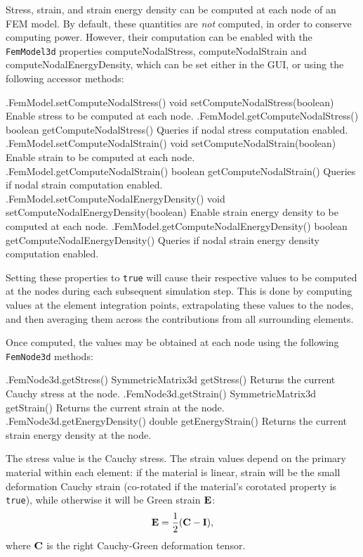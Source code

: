 Stress, strain, and strain energy density can be computed at each node
of an FEM model. By default, these quantities are {\it not} computed,
in order to conserve computing power. However, their computation can
be enabled with the {\tt FemModel3d} properties {\sf
computeNodalStress}, {\sf computeNodalStrain} and {\sf
computeNodalEnergyDensity}, which can be set either in the GUI, or
using the following accessor methods:
%
\begin{methodtable}{0.45}{0.55}
\midline
%
\methodentry
{\fem.FemModel.setComputeNodalStress()}%
{void setComputeNodalStress(boolean)}%
{Enable stress to be computed at each node.}%
%
\methodentry
{\fem.FemModel.getComputeNodalStress()}%
{boolean getComputeNodalStress()}%
{Queries if nodal stress computation enabled.}%
%
\methodspace{0.5em}
%
\methodentry
{\fem.FemModel.setComputeNodalStrain()}%
{void setComputeNodalStrain(boolean)}%
{Enable strain to be computed at each node.}%
%
\methodentry
{\fem.FemModel.getComputeNodalStrain()}%
{boolean getComputeNodalStrain()}%
{Queries if nodal strain computation enabled.}%
%
\methodspace{0.5em}
%
\methodentry
{\fem.FemModel.setComputeNodalEnergyDensity()}%
{void setComputeNodalEnergyDensity(boolean)}%
{Enable strain energy density to be computed at each node.}%
%
\methodentry
{\fem.FemModel.getComputeNodalEnergyDensity()}%
{boolean getComputeNodalEnergyDensity()}%
{Queries if nodal strain energy density computation enabled.}%
%
\midline
\end{methodtable}
%
Setting these properties to {\tt true} will cause their respective
values to be computed at the nodes during each subsequent simulation
step. This is done by computing values at the element integration
points, extrapolating these values to the nodes, and then averaging
them across the contributions from all surrounding elements.

Once computed, the values may be obtained at each node using the
following {\tt FemNode3d} methods:
%
\begin{methodtable}{0.45}{0.55}
\midline
%
\methodentry
{\fem.FemNode3d.getStress()}%
{SymmetricMatrix3d getStress()}%
{Returns the current Cauchy stress at the node.}%
%
\methodentry
{\fem.FemNode3d.getStrain()}%
{SymmetricMatrix3d getStrain()}%
{Returns the current strain at the node.}%
%
\methodentry
{\fem.FemNode3d.getEnergyDensity()}%
{double getEnergyStrain()}%
{Returns the current strain energy density at the node.}%
%
\midline
\end{methodtable}
%
The stress value is the Cauchy stress. The strain values depend on the
primary material within each element: if the material is linear,
strain will be the small deformation Cauchy strain (co-rotated if the
material's {\sf corotated} property is {\tt true}), while otherwise it
will be Green strain ${\bf E}$:
%
\begin{equation}
{\bf E} = \frac{1}{2}({\bf C} - {\bf I}),
\end{equation}
%
where ${\bf C}$ is the right Cauchy-Green deformation tensor.

